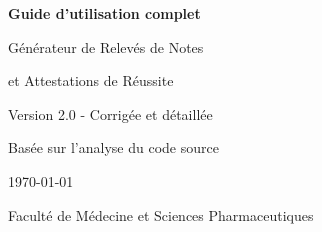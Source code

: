 \documentclass[12pt,a4paper]{article}
\begin{document}
\begin{titlepage}
    \centering
    \vspace*{2cm}

    {\Huge\bfseries Guide d'utilisation complet\par}
    \vspace{1cm}
    {\LARGE Générateur de Relevés de Notes\par}
    {\LARGE et Attestations de Réussite\par}
    \vspace{1.5cm}

    \begin{figure}[h]
        \centering
    \end{figure}

    \vspace{2cm}
    {\Large Version 2.0 - Corrigée et détaillée\par}
    \vspace{0.5cm}
    {\large Basée sur l'analyse du code source\par}
    \vspace{1cm}
    {\large \today\par}

    \vfill
    {\large Faculté de Médecine et Sciences Pharmaceutiques\par}
\end{titlepage}

\tableofcontents
\newpage











\end{document}
